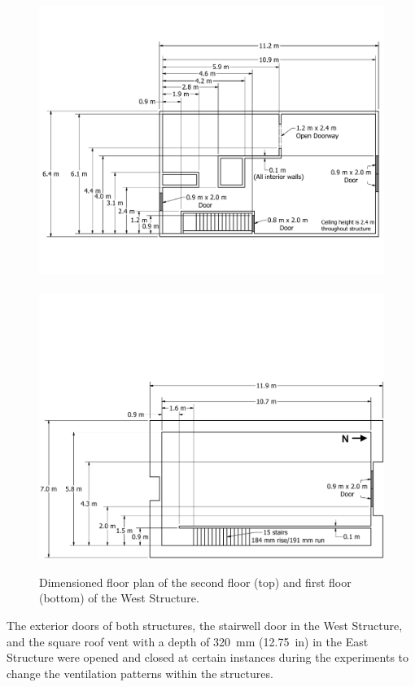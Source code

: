 \begin{figure}[!h]
	\centering
	\includegraphics[width=\columnwidth]{Figures/Floor_Plans/West_Structure_2nd_Floor_Dimensioned_Full}
	\\~\\
	\includegraphics[width=\columnwidth]{Figures/Floor_Plans/West_Structure_1st_Floor_Dimensioned_Full}
	\caption[Dimensioned floor plans of the West Structure]{Dimensioned floor plan of the second floor (top) and first floor (bottom) of the West Structure.}
	\label{fig:west_dimensioned_plan}
\end{figure}
\clearpage
The exterior doors of both structures, the stairwell door in the West Structure, and the square roof vent with a depth of 320~mm (12.75~in) in the East Structure were opened and closed at certain instances during the experiments to change the ventilation patterns within the structures.

